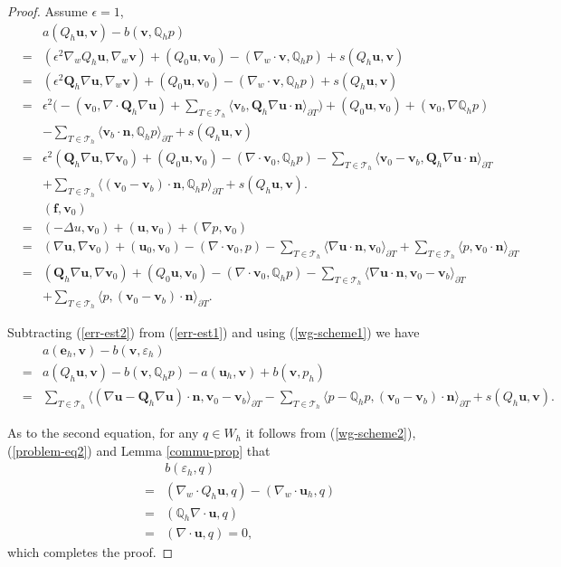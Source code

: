 \documentclass[leqno]{siamltex704}
\numberwithin{equation}{section}
\def\dQ{{\mathbb{Q}}}
\def\bQ{{\mathbf{Q}}}
\def\sumT{\sum_{T\in\mathcal{T}_h}}     %
\def\la{\langle}
\def\ra{\rangle_{\partial T}}
\def\e{\varepsilon}
\def\bu{{\mathbf{u}}}
\def\bv{{\mathbf{v}}}
\def\bn{{\mathbf{n}}}
\def\be{{\mathbf{e}}}
\def\bf{{\mathbf{f}}}
\begin{document}
\begin{proof}
  Assume $\epsilon=1$,
  {\color{red}
    \begin{eqnarray*} 
        &&a(Q_h\bu,\bv)-b(\bv,\dQ_h p)
    \\ \nonumber
    &=&(\epsilon^2\nabla_w Q_h\bu,\nabla_w\bv)+(Q_0\bu,\bv_0)-(\nabla_w\cdot\bv,\dQ_h p)+ s(Q_h\bu,\bv)
    \\ \nonumber
    &=&(\epsilon^2\bQ_h\nabla \bu,\nabla_w\bv)+(Q_0\bu,\bv_0)-(\nabla_w\cdot\bv,\dQ_h p)+ s(Q_h\bu,\bv)
    \\ \nonumber
    &=&\epsilon^2\bigg(-(\bv_0,\nabla\cdot\bQ_h\nabla \bu)+\sumT\la\bv_b,\bQ_h\nabla\bu\cdot\bn\ra\bigg)+(Q_0\bu,\bv_0)
    +(\bv_0,\nabla\dQ_h p)
    \\ \nonumber
    &&-\sumT\la\bv_b\cdot\bn,\dQ_h p\ra + s(Q_h\bu,\bv)
    \\ %
    &=&\epsilon^2(\bQ_h\nabla\bu,\nabla\bv_0)+(Q_0\bu,\bv_0) - (\nabla\cdot\bv_0,\dQ_h p)
    -\sumT\la \bv_0-\bv_b,\bQ_h\nabla \bu\cdot\bn\ra
    \\ \nonumber
    && + \sumT\la (\bv_0-\bv_b)\cdot\bn,\dQ_h p\ra
    +s(Q_h\bu,\bv).
  \end{eqnarray*}
  }
  {\color{red}
    \begin{eqnarray*} %
    &&(\bf,\bv_0)
    \\ \nonumber
    &=&(-\Delta u,\bv_0)+(\bu,\bv_0) + (\nabla p,\bv_0)
    \\ \nonumber
    &=& (\nabla\bu,\nabla\bv_0)+(\bu_0,\bv_0) - (\nabla\cdot\bv_0,p) 
    -\sumT\la \nabla\bu\cdot\bn,\bv_0\ra + \sumT\la p,\bv_0\cdot\bn\ra
    \\ \nonumber
    &=&(\bQ_h\nabla\bu,\nabla\bv_0)+(Q_0\bu,\bv_0) - (\nabla\cdot\bv_0,\dQ_h p)
    -\sumT\la \nabla\bu\cdot\bn,\bv_0-\bv_b\ra
    \\ \nonumber
    && + \sumT\la p,(\bv_0-\bv_b)\cdot\bn\ra.
  \end{eqnarray*}
  }
  
  Subtracting (\ref{err-est2}) from (\ref{err-est1}) and using (\ref{wg-scheme1}) we have
  \begin{eqnarray*}
    &&a(\be_h,\bv) - b(\bv,\e_h)
    \\
    &=& a(Q_h\bu,\bv) - b(\bv,\dQ_h p) - a(\bu_h,\bv) + b(\bv,p_h)
    \\
    &=& \sumT\la (\nabla\bu-\bQ_h\nabla\bu)\cdot\bn,\bv_0-\bv_b\ra - \sumT\la p-\dQ_h p,(\bv_0-\bv_b)\cdot\bn\ra + s(Q_h\bu,\bv).
  \end{eqnarray*} 

  
  As to the second equation, for any $q\in W_h$ it follows from (\ref{wg-scheme2}), (\ref{problem-eq2}) and Lemma \ref{commu-prop} that
  \begin{eqnarray*}
    &&b(\e_h,q)
    \\
    &=& (\nabla_w \cdot Q_h\bu,q) - (\nabla_w \cdot\bu_h,q)
    \\
    &=& (\dQ_h\nabla\cdot\bu,q)
    \\
    &=& (\nabla\cdot\bu,q) = 0,
  \end{eqnarray*}
  which completes the proof.
\end{proof}
\end{document}
